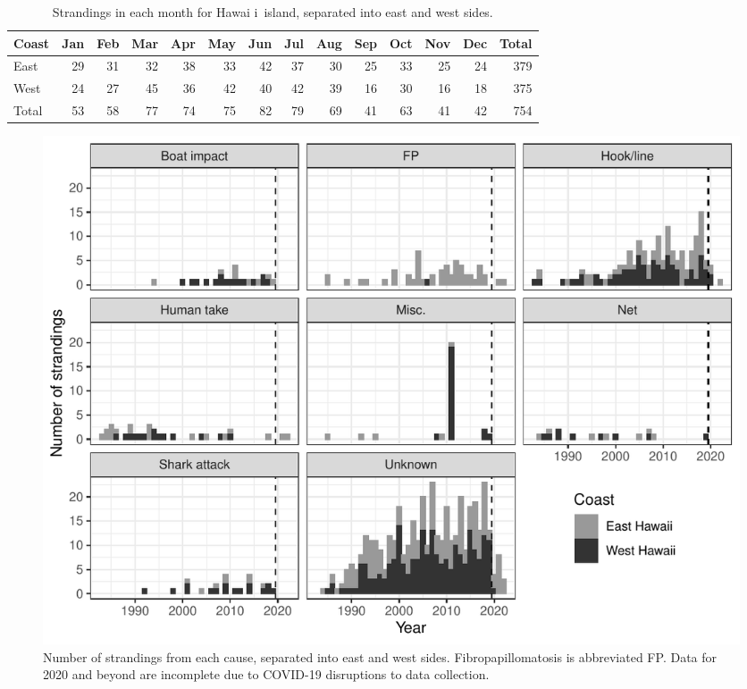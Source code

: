 \documentclass[sn-basic,NameDate]{sn-jnl}\usepackage[]{graphicx}\usepackage[]{xcolor}
\makeatletter
\def\maxwidth{ %
  \ifdim\Gin@nat@width>\linewidth
    \linewidth
  \else
    \Gin@nat@width
  \fi
}
\newenvironment{knitrout}{}{} %
\DeclareRobustCommand{\okina}{%
  \raisebox{\dimexpr\fontcharht\font`A-\height}{%
    \scalebox{0.8}{`}%
  }%
}
\newcommand{\Hawaii}{Hawai\okina i}
\makeatother
\begin{document}
\begin{table}[tbp]
\caption{Strandings in each month for \Hawaii\ island, separated into east and west sides.}\label{tab:monthside}
\begin{knitrout}
\color{fgcolor}
\begin{tabular}{lrrrrrrrrrrrrr}
\toprule
Coast & Jan & Feb & Mar & Apr & May & Jun & Jul & Aug & Sep & Oct & Nov & Dec & Total\\
\midrule
East & 29 & 31 & 32 & 38 & 33 & 42 & 37 & 30 & 25 & 33 & 25 & 24 & 379\\
West & 24 & 27 & 45 & 36 & 42 & 40 & 42 & 39 & 16 & 30 & 16 & 18 & 375\\
\addlinespace
Total & 53 & 58 & 77 & 74 & 75 & 82 & 79 & 69 & 41 & 63 & 41 & 42 & 754\\
\bottomrule
\end{tabular}

\end{knitrout}
\end{table}




\begin{figure}[tbp]
\centering
\begin{knitrout}
\color{fgcolor}
\includegraphics[width=\maxwidth]{figure/Figure-3} 
\end{knitrout}
\caption{Number of strandings from each cause, separated into east and west sides. Fibropapillomatosis is abbreviated FP. Data for 2020 and beyond are incomplete due to COVID-19 disruptions to data collection.}
\label{fig:cause}
\end{figure}
\end{document}
